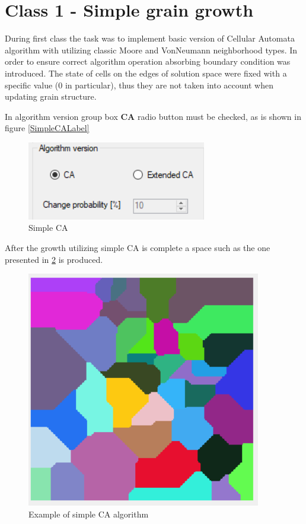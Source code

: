 \documentclass[a4paper, 11pt]{article}
\begin{document}
\section*{Class 1 - Simple grain growth}
During first class the task was to implement basic version of Cellular Automata algorithm with utilizing classic Moore and VonNeumann neighborhood types. In order to ensure correct algorithm operation absorbing boundary condition was introduced. The state of cells on the edges of solution space were fixed with a specific value (0 in particular), thus they are not taken into account when updating grain structure.

In algorithm version group box \textbf{CA} radio button must be checked, as is shown in figure \ref{SimpleCALabel}
\begin{figure}[H]
\centering
  \includegraphics{SimpleCAGroupBox}
  \caption{Simple CA}
  \label{SimpleCALabel}
  \label{fig:boat1}
\end{figure}

After the growth utilizing simple CA is complete a space such as the one presented in \ref{SimpleCAExample} is produced.
\begin{figure}[H]
\centering
  \includegraphics[]{SimpleCAExample}
  \caption{Example of simple CA algorithm}
  \label{SimpleCAExample}
\end{figure}
\end{document}
